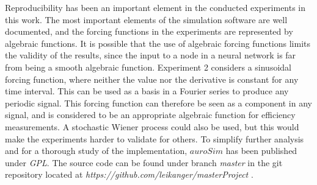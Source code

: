 	Reproducibility has been an important element in the conducted experiments in this work.
	The most important elements of the simulation software are well documented, and the forcing functions in the experiments are represented by algebraic functions.
	It is possible that the use of algebraic forcing functions limits the validity of the results, since the input to a node in a neural network is far from being a smooth algebraic function.
	Experiment 2 considers a sinusoidal forcing function, where neither the value nor the derivative is constant for any time interval. %
	This can be used as a basis in a Fourier series to produce any periodic signal.
	This forcing function can therefore be seen as a component in any signal, and is considered to be an appropriate algebraic function for efficiency measurements. %
	A stochastic Wiener process could also be used, but this would make the experiments harder to validate for others.
% 	
	To simplify further analysis and for a thorough study of the implementation, $auroSim$ has been published under \emph{GPL}.
	The source code can be found under branch \emph{master} in the git repository located at \emph{https://github.com/leikanger/masterProject} \cite{gitRepoCommit}.


